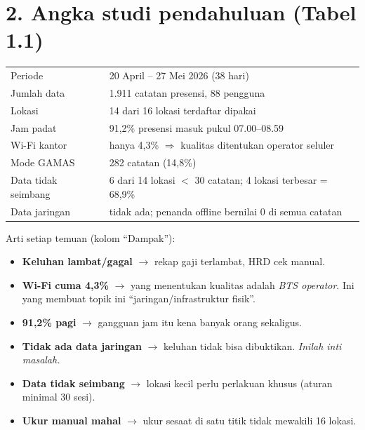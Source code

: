 \section*{2. Angka studi pendahuluan (Tabel 1.1)}
\begin{hafal}
\begin{tabularx}{\linewidth}{@{}lX@{}}
Periode & 20 April -- 27 Mei 2026 (38 hari) \\
Jumlah data & 1.911 catatan presensi, 88 pengguna \\
Lokasi & 14 dari 16 lokasi terdaftar dipakai \\
Jam padat & 91,2\% presensi masuk pukul 07.00--08.59 \\
Wi-Fi kantor & hanya 4,3\% $\Rightarrow$ kualitas ditentukan operator seluler \\
Mode GAMAS & 282 catatan (14,8\%) \\
Data tidak seimbang & 6 dari 14 lokasi $<$ 30 catatan; 4 lokasi terbesar = 68,9\% \\
Data jaringan & tidak ada; penanda offline bernilai 0 di semua catatan \\
\end{tabularx}
\end{hafal}
Arti setiap temuan (kolom ``Dampak''):
\begin{itemize}
  \item \textbf{Keluhan lambat/gagal} $\rightarrow$ rekap gaji terlambat, HRD cek manual.
  \item \textbf{Wi-Fi cuma 4,3\%} $\rightarrow$ yang menentukan kualitas adalah \textit{BTS operator}. Ini yang membuat topik ini ``jaringan/infrastruktur fisik''.
  \item \textbf{91,2\% pagi} $\rightarrow$ gangguan jam itu kena banyak orang sekaligus.
  \item \textbf{Tidak ada data jaringan} $\rightarrow$ keluhan tidak bisa dibuktikan. \textit{Inilah inti masalah.}
  \item \textbf{Data tidak seimbang} $\rightarrow$ lokasi kecil perlu perlakuan khusus (aturan minimal 30 sesi).
  \item \textbf{Ukur manual mahal} $\rightarrow$ ukur sesaat di satu titik tidak mewakili 16 lokasi.
\end{itemize}

